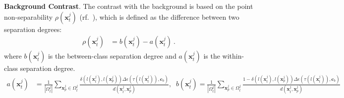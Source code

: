 %
%

\vspace{2mm}
\noindent\textbf{Background Contrast}.
The contrast with the background is based on the  point non-separability $\rho (\mathbf{x}^j_t)$ (rf.~\cite{Wang2018}), which is defined as the difference between two  separation degrees:
\begin{align}
\rho(\mathbf{x}^j_t)&= b(\mathbf{x}^j_t)-a(\mathbf{x}^j_t) \ .
\end{align}
where $b(\mathbf{x}^j_t)$ is the between-class separation degree and $a(\mathbf{x}^j_t)$ is the within-class separation degree.
\begin{align}
a(\mathbf{x}^j_t)&=\frac{1}{|\Omega^j_t|}\sum_{\mathbf{x}^j_p \in \Omega^j_t } \frac{\delta(l(\mathbf{x}^j_t), l(\mathbf{x}^j_p))
\Delta\epsilon(\tau(l(\mathbf{x}^j_t)),\mathbf{c}_b)
}{d(\mathbf{x}^j_t,\mathbf{x}^j_p)} , \;\;
b(\mathbf{x}^j_t)=\frac{1}{|\Omega^j_t|}\sum_{\mathbf{x}^j_p \in \Omega^j_t } \frac{1-\delta(l(\mathbf{x}^j_t), l(\mathbf{x}^j_p))\Delta\epsilon(\tau(l(\mathbf{x}^j_t)),\mathbf{c}_b)}{d(\mathbf{x}^j_t,\mathbf{x}^j_p)}  \nonumber
\end{align}

